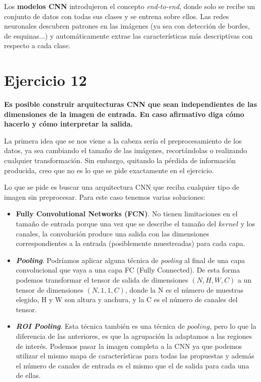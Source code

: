 \documentclass[11pt,a4paper]{article}
\begin{document}
Los \textbf{modelos CNN} introdujeron el concepto \textit{end-to-end}, donde solo se recibe un conjunto de datos con todas sus clases y se entrena sobre ellos. Las redes
neuronales descubren patrones en las imágenes (ya sea con detección de bordes, de esquinas...) y automáticamente extrae las características más descriptivas con respecto a
cada clase.


\section*{Ejercicio 12}

\textbf{Es posible construir arquitecturas CNN que sean independientes de las dimensiones de la imagen de entrada. En caso afirmativo diga cómo hacerlo y cómo
interpretar la salida.}

La primera idea que se nos viene a la cabeza sería el preprocesamiento de los datos, ya sea cambiando el tamaño de las imágenes, recortándolas o realizando cualquier
transformación. Sin embargo, quitando la pérdida de información producida, creo que no es lo que se pide exactamente en el ejercicio.

Lo que se pide es buscar una arquitectura CNN que reciba cualquier tipo de imagen sin preprocesar. Para este caso tenemos varias soluciones:
\begin{itemize}
	\item \textbf{Fully Convolutional Networks (FCN)}. No tienen limitaciones en el tamaño de entrada porque una vez que se describe el tamaño del $kernel$ y los canales,
		  la convolución produce una salida con las dimensiones correspondientes a la entrada (posiblemente muestreadas) para cada capa.
	\item \textbf{\textit{Pooling}}. Podríamos aplicar alguna técnica de \textit{pooling} al final de una capa convolucional que vaya a una capa FC (Fully Connected). De
		  esta forma podemos transformar el tensor de salida de dimensiones $(N, H, W, C)$ a un tensor de dimensiones $(N, 1, 1, C)$, donde la N es el número de muestras
		  elegido, H y W son altura y anchura, y la C es el número de canales del tensor.
	\item \textbf{\textit{ROI Pooling}}. Esta técnica también es una técnica de $pooling$, pero lo que la diferencia de las anteriores, es que la agrupación la adaptamos
		  a las regiones de interés. Podemos pasar la imagen completa a la CNN ya que podemos utilizar el mismo mapa de características para todas las propuestas y además
		  el número de canales de entrada es el mismo que el de salida para cada una de ellas.


\end{itemize}
\end{document}
